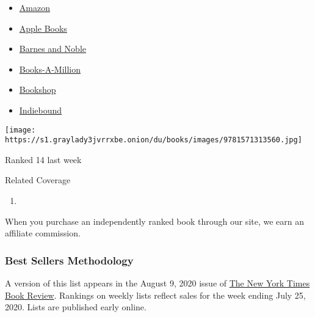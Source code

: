 \begin{enumerate}
  \begin{itemize}
  \tightlist
  \item
    \href{https://www.amazon.com/Braiding-Sweetgrass-Indigenous-Scientific-Knowledge/dp/1571313567?tag=NYTBS-20}{Amazon}
  \item
    \href{https://du-gae-books-dot-nyt-du-prd.appspot.com/buy?title=BRAIDING+SWEETGRASS\&author=Robin+Wall+Kimmerer}{Apple
    Books}
  \item
    \href{https://www.anrdoezrs.net/click-7990613-11819508?url=https\%3A\%2F\%2Fwww.barnesandnoble.com\%2Fw\%2F\%3Fean\%3D9781571313560}{Barnes
    and Noble}
  \item
    \href{https://www.anrdoezrs.net/click-7990613-35140?url=https\%3A\%2F\%2Fwww.booksamillion.com\%2Fp\%2FBRAIDING\%2BSWEETGRASS\%2FRobin\%2BWall\%2BKimmerer\%2F9781571313560}{Books-A-Million}
  \item
    \href{https://bookshop.org/a/3546/9781571313560}{Bookshop}
  \item
    \href{https://www.indiebound.org/book/9781571313560?aff=NYT}{Indiebound}
  \end{itemize}

  \texttt{[image: https://s1.graylady3jvrrxbe.onion/du/books/images/9781571313560.jpg]}

  Ranked 14 last week
\end{enumerate}

Related Coverage

\begin{enumerate}
\def\labelenumi{\arabic{enumi}.}
\tightlist
\item
  \href{https://www.nytimes3xbfgragh.onion/2020/07/31/books/review/the-system-robert-reich-break-em-up-zephyr-teachout.html}{}
\end{enumerate}

When you purchase an independently ranked book through our site, we earn
an affiliate commission.

\hypertarget{best-sellers-methodology}{%
\subsubsection{Best Sellers
Methodology}\label{best-sellers-methodology}}

A version of this list appears in the August 9, 2020 issue of
\href{http://www.nytimes3xbfgragh.onion/section/books/review}{The New
York Times Book Review}. Rankings on weekly lists reflect sales for the
week ending July 25, 2020. Lists are published early online.

